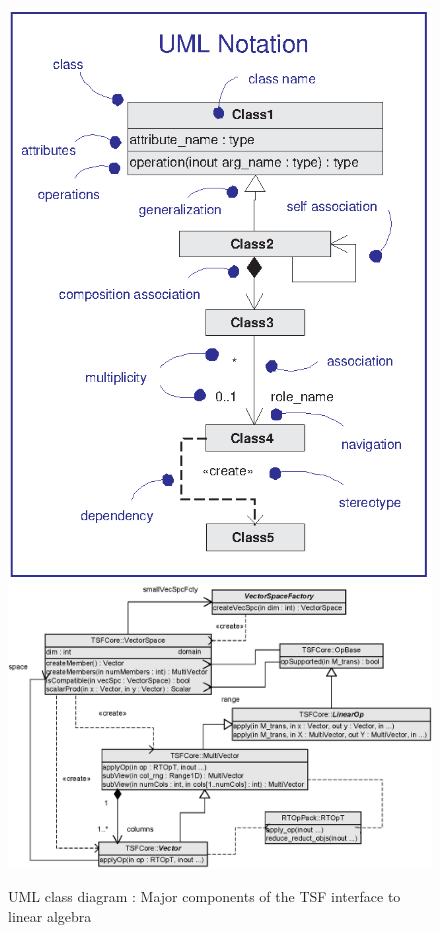 {\bsinglespace
\begin{figure}[t]
\begin{center}
\includegraphics*[bb= 0.0in 0.0in 3.3in 4.4in,scale=0.40
]{UML1}
\includegraphics*[scale=0.65]{TSFCore}
\end{center}
\caption{
\label{tsfcore:fig:tsfl_basic}
UML class diagram : Major components of the TSF
interface to linear algebra
}
\end{figure}
\esinglespace}

